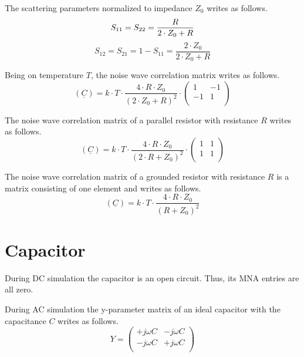 The scattering parameters normalized to impedance $Z_0$
writes as follows.
\begin{equation}
S_{11} = S_{22} = \frac{R}{2\cdot Z_0+R} \\
\end{equation}
\begin{equation}
S_{12} = S_{21} = 1-S_{11} = \frac{2\cdot Z_0}{2\cdot Z_0+R}
\end{equation}

Being on temperature $T$, the noise wave correlation matrix
writes as follows.
\begin{equation}
(\underline{C}) = k\cdot T\cdot\frac{4\cdot R\cdot Z_0}{(2\cdot Z_0+R)^2}\cdot
\begin{pmatrix}
   1 & -1\\
  -1 &  1\\
\end{pmatrix}
\end{equation}

The noise wave correlation matrix of a parallel resistor with resistance $R$
writes as follows.
\begin{equation}
(\underline{C}) = k\cdot T\cdot\frac{4\cdot R\cdot Z_0}{(2\cdot R+Z_0)^2}\cdot
\begin{pmatrix}
  1 & 1\\
  1 & 1\\
\end{pmatrix}
\end{equation}

The noise wave correlation matrix of a grounded resistor with resistance $R$
is a matrix consisting of one element and writes as follows.
\begin{equation}
(\underline{C}) = k\cdot T\cdot\frac{4\cdot R\cdot Z_0}{(R+Z_0)^2}
\end{equation}


\section{Capacitor}

During DC simulation the capacitor is an open circuit. Thus, its MNA
entries are all zero.

\addvspace{12pt}

During AC simulation the y-parameter matrix of an ideal capacitor
with the capacitance $C$ writes as follows.
\begin{equation}
Y =
\begin{pmatrix}
+j\omega C & -j\omega C\\
-j\omega C & +j\omega C\\
\end{pmatrix}
\end{equation}

